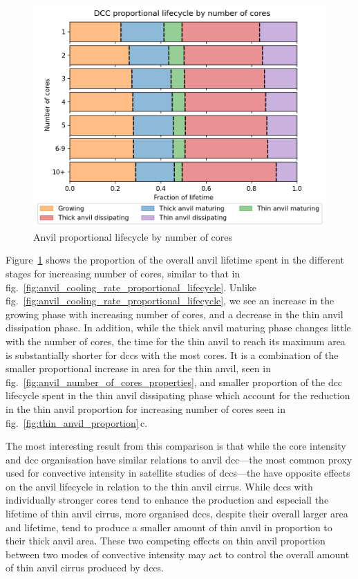 \begin{figure}[tp]
    \centering
    \includegraphics[width=\textwidth]{figures/ch2_26.png}
    \caption{Anvil proportional lifecycle by number of cores}
    \label{fig:anvil_number_of_cores_proportional_lifecycle}
\end{figure}

Figure~\ref{fig:anvil_number_of_cores_proportional_lifecycle} shows the proportion of the overall anvil lifetime spent in the different stages for increasing number of cores, similar to that in fig.~\ref{fig:anvil_cooling_rate_proportional_lifecycle}.
Unlike fig.~\ref{fig:anvil_cooling_rate_proportional_lifecycle}, we see an increase in the growing phase with increasing number of cores, and a decrease in the thin anvil dissipation phase.
In addition, while the thick anvil maturing phase changes little with the number of cores, the time for the thin anvil to reach its maximum area is substantially shorter for \acrshort{dcc}s with the most cores.
It is a combination of the smaller proportional increase in area for the thin anvil, seen in fig.~\ref{fig:anvil_number_of_cores_properties}, and smaller proportion of the \acrshort{dcc} lifecycle spent in the thin anvil dissipating phase which account for the reduction in the thin anvil proportion for increasing number of cores seen in fig.~\ref{fig:thin_anvil_proportion}\,c.

The most interesting result from this comparison is that while the core intensity and \acrshort{dcc} organisation have similar relations to anvil \acrshort{dcc}---the most common proxy used for convective intensity in satellite studies of \acrshort{dcc}s---the have opposite effects on the anvil lifecycle in relation to the thin anvil cirrus.
While \acrshort{dcc}s with individually stronger cores tend to enhance the production and especiall the lifetime of thin anvil cirrus, more organised \acrshort{dcc}s, despite their overall larger area and lifetime, tend to produce a smaller amount of thin anvil in proportion to their thick anvil area.
These two competing effects on thin anvil proportion between two modes of convective intensity may act to control the overall amount of thin anvil cirrus produced by \acrshort{dcc}s.


